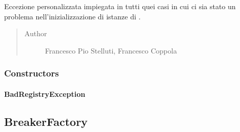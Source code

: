 \documentclass[letterpaper,10pt,italian,openany,oneside]{sphinxmanual}
\begin{document}
\begin{fulllineitems}
\label{\detokenize{source/it/unicam/cs/pa/mastermind/factories/BadRegistryException:it.unicam.cs.pa.mastermind.factories.BadRegistryException}}
Eccezione personalizzata impiegata in tutti quei casi in cui ci sia stato un problema nell’inizializzazione di istanze di .
\begin{quote}\begin{description}
\item[{Author}] \leavevmode
Francesco Pio Stelluti, Francesco Coppola

\end{description}\end{quote}

\end{fulllineitems}



\subsubsection{Constructors}
\label{\detokenize{source/it/unicam/cs/pa/mastermind/factories/BadRegistryException:constructors}}

\paragraph{BadRegistryException}
\label{\detokenize{source/it/unicam/cs/pa/mastermind/factories/BadRegistryException:id1}}

\begin{fulllineitems}
\label{\detokenize{source/it/unicam/cs/pa/mastermind/factories/BadRegistryException:it.unicam.cs.pa.mastermind.factories.BadRegistryException.BadRegistryException(String)}}
\end{fulllineitems}



\subsection{BreakerFactory}
\label{\detokenize{source/it/unicam/cs/pa/mastermind/factories/BreakerFactory:breakerfactory}}\label{\detokenize{source/it/unicam/cs/pa/mastermind/factories/BreakerFactory::doc}}
\end{document}
